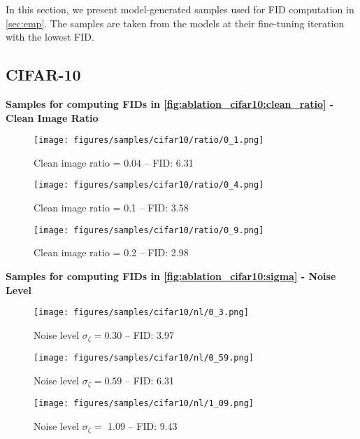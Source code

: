 In this section, we present model-generated samples used for FID computation in \cref{sec:emp}. The samples are taken from the models at their fine-tuning iteration with the lowest FID.

\subsection{CIFAR-10}
\textbf{Samples for computing FIDs in \cref{fig:ablation_cifar10:clean_ratio} - Clean Image Ratio}

\FloatBarrier

\begin{figure}[h!]
    \centering
    \texttt{[image: figures/samples/cifar10/ratio/0\_1.png]}
    \caption{Clean image ratio = 0.04 -- FID: 6.31}
\end{figure}

\begin{figure}[h!]
    \centering
    \texttt{[image: figures/samples/cifar10/ratio/0\_4.png]}
    \caption{Clean image ratio = 0.1  -- FID: 3.58 }
\end{figure}

\begin{figure}[h!]
    \centering
    \texttt{[image: figures/samples/cifar10/ratio/0\_9.png]}
    \caption{Clean image ratio = 0.2 -- FID: 2.98}
\end{figure}



\textbf{Samples for computing FIDs in \cref{fig:ablation_cifar10:sigma} - Noise Level}


\begin{figure}[h!]
    \centering
    \texttt{[image: figures/samples/cifar10/nl/0\_3.png]}
    \caption{Noise level $\sigma_\zeta = 0.30$ -- FID: 3.97}
\end{figure}

\begin{figure}[h!]
    \centering
    \texttt{[image: figures/samples/cifar10/nl/0\_59.png]}
    \caption{Noise level $\sigma_\zeta = 0.59 $ -- FID: 6.31 }
\end{figure}

\begin{figure}[h!]
    \centering
    \texttt{[image: figures/samples/cifar10/nl/1\_09.png]}
    \caption{Noise level $\sigma_\zeta = $ 1.09 -- FID: 9.43}
\end{figure}


